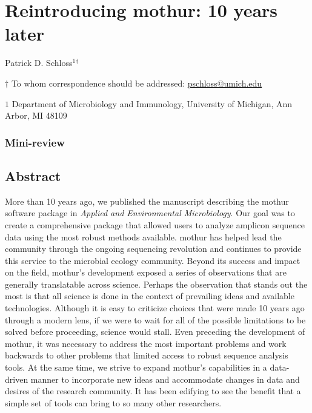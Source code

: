 \documentclass[11pt,]{article}
\title{}
\author{}
\date{}
\begin{document}
\vspace*{10mm}

\hypertarget{reintroducing-mothur-10-years-later}{%
\section{Reintroducing mothur: 10 years
later}\label{reintroducing-mothur-10-years-later}}

\vspace{35mm}

Patrick D. Schloss\({^1}\)\({^\dagger}\)

\vspace{40mm}

\(\dagger\) To whom correspondence should be addressed:
\href{mailto:pschloss@umich.edu}{pschloss@umich.edu}

\(1\) Department of Microbiology and Immunology, University of Michigan,
Ann Arbor, MI 48109

\vspace{35mm}

\hypertarget{mini-review}{%
\subsubsection{Mini-review}\label{mini-review}}

\newpage
\linenumbers

\hypertarget{abstract}{%
\subsection{Abstract}\label{abstract}}

More than 10 years ago, we published the manuscript describing the
mothur software package in \emph{Applied and Environmental
Microbiology}. Our goal was to create a comprehensive package that
allowed users to analyze amplicon sequence data using the most robust
methods available. mothur has helped lead the community through the
ongoing sequencing revolution and continues to provide this service to
the microbial ecology community. Beyond its success and impact on the
field, mothur's development exposed a series of observations that are
generally translatable across science. Perhaps the observation that
stands out the most is that all science is done in the context of
prevailing ideas and available technologies. Although it is easy to
criticize choices that were made 10 years ago through a modern lens, if
we were to wait for all of the possible limitations to be solved before
proceeding, science would stall. Even preceding the development of
mothur, it was necessary to address the most important problems and work
backwards to other problems that limited access to robust sequence
analysis tools. At the same time, we strive to expand mothur's
capabilities in a data-driven manner to incorporate new ideas and
accommodate changes in data and desires of the research community. It
has been edifying to see the benefit that a simple set of tools can
bring to so many other researchers.
\end{document}
